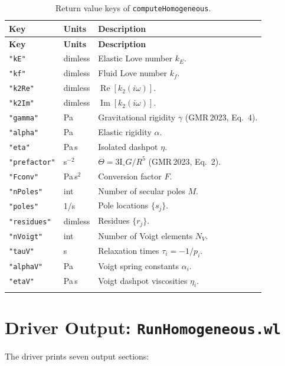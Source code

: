 \documentclass[11pt]{article}
\begin{document}
\begin{longtable}{@{}llp{6.5cm}@{}}
\toprule
\textbf{Key} & \textbf{Units} & \textbf{Description} \\
\midrule
\endfirsthead
\toprule
\textbf{Key} & \textbf{Units} & \textbf{Description} \\
\midrule
\endhead
\texttt{"kE"}        & dimless & Elastic Love number $k_E$. \\
\texttt{"kf"}        & dimless & Fluid Love number $k_f$. \\
\texttt{"k2Re"}      & dimless & $\operatorname{Re}[k_2(i\omega)]$. \\
\texttt{"k2Im"}      & dimless & $\operatorname{Im}[k_2(i\omega)]$. \\
\texttt{"gamma"}     & Pa & Gravitational rigidity $\gamma$
  (GMR\,2023, Eq.~4). \\
\texttt{"alpha"}     & Pa & Elastic rigidity $\alpha$. \\
\texttt{"eta"}       & Pa\,s & Isolated dashpot $\eta$. \\
\texttt{"prefactor"} & s$^{-2}$ & $\Theta = 3\mathrm{I}_\circ G/R^5$
  (GMR\,2023, Eq.~2). \\
\texttt{"Fconv"}     & Pa\,s$^2$ & Conversion factor $F$. \\
\texttt{"nPoles"}    & int & Number of secular poles $M$. \\
\texttt{"poles"}     & 1/s & Pole locations $\{s_j\}$. \\
\texttt{"residues"}  & dimless & Residues $\{r_j\}$. \\
\texttt{"nVoigt"}    & int & Number of Voigt elements $N_V$. \\
\texttt{"tauV"}      & s & Relaxation times $\tau_i = -1/p_i$. \\
\texttt{"alphaV"}    & Pa & Voigt spring constants $\alpha_i$. \\
\texttt{"etaV"}      & Pa\,s & Voigt dashpot viscosities $\eta_i$. \\
\bottomrule
\caption{Return value keys of \texttt{computeHomogeneous}.}
\end{longtable}

\section{Driver Output: \texttt{RunHomogeneous.wl}}
\label{sec:output}

The driver prints seven output sections:
\end{document}
